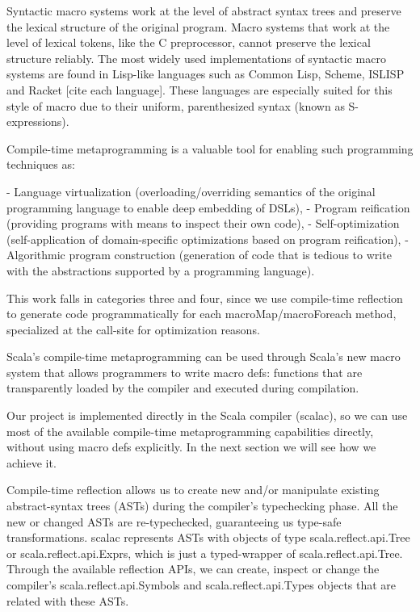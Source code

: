 Syntactic macro systems work at the level of abstract syntax trees and preserve
the lexical structure of the original program. Macro systems that work at the
level of lexical tokens, like the C preprocessor, cannot preserve the
lexical structure reliably. The most widely used implementations of syntactic
macro systems are found in Lisp-like languages such as Common Lisp, Scheme,
ISLISP and Racket [cite each language]. These languages are especially suited
for this style of macro due to their uniform, parenthesized syntax (known as
S-expressions).

Compile-time metaprogramming is a valuable tool for enabling such programming
techniques as:

- Language virtualization (overloading/overriding semantics of the original
programming language to enable deep embedding of DSLs),
- Program reification (providing programs with means to inspect their own code),
- Self-optimization (self-application of domain-specific optimizations based on
program reification),
- Algorithmic program construction (generation of code that is tedious to write
with the abstractions supported by a programming language).

This work falls in categories three and four, since we use compile-time
reflection to generate code programmatically for each macroMap/macroForeach
method, specialized at the call-site for optimization reasons.

 Scala's compile-time metaprogramming can be used through Scala's new macro
system that allows programmers to write macro defs: functions that are
transparently loaded by the compiler and executed during compilation.

Our project is implemented directly in the Scala compiler (scalac), so we can
use most of the available compile-time metaprogramming capabilities directly,
without using macro defs explicitly. In the next section we will see how we
achieve it.

Compile-time reflection allows us to create new and/or manipulate
existing abstract-syntax trees (ASTs) during the compiler's typechecking phase.
All the new or changed ASTs are re-typechecked, guaranteeing us type-safe
transformations. scalac represents ASTs with objects of type
scala.reflect.api.Tree or scala.reflect.api.Exprs, which is just a typed-wrapper
of scala.reflect.api.Tree. Through the available reflection APIs, we can create,
inspect or change the compiler's scala.reflect.api.Symbols and
scala.reflect.api.Types objects that are related with these ASTs.

